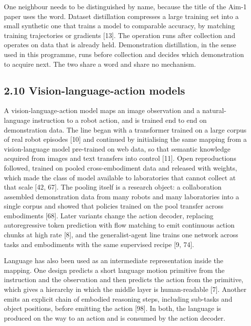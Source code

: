 \documentclass[
  11pt,
]{article}
\begin{document}
One neighbour needs to be distinguished by name, because the title of
the Aim-1 paper uses the word. Dataset distillation compresses a large
training set into a small synthetic one that trains a model to
comparable accuracy, by matching training trajectories or gradients
{[}13{]}. The operation runs after collection and operates on data that
is already held. Demonstration distillation, in the sense used in this
programme, runs before collection and decides which demonstration to
acquire next. The two share a word and share no mechanism.

\hypertarget{vision-language-action-models}{%
\subsection{2.10 Vision-language-action
models}\label{vision-language-action-models}}

A vision-language-action model maps an image observation and a
natural-language instruction to a robot action, and is trained end to
end on demonstration data. The line began with a transformer trained on
a large corpus of real robot episodes {[}10{]} and continued by
initialising the same mapping from a vision-language model pre-trained
on web data, so that semantic knowledge acquired from images and text
transfers into control {[}11{]}. Open reproductions followed, trained on
pooled cross-embodiment data and released with weights, which made the
class of model available to laboratories that cannot collect at that
scale {[}42, 67{]}. The pooling itself is a research object: a
collaboration assembled demonstration data from many robots and many
laboratories into a single corpus and showed that policies trained on
the pool transfer across embodiments {[}68{]}. Later variants change the
action decoder, replacing autoregressive token prediction with flow
matching to emit continuous action chunks at high rate {[}8{]}, and the
generalist-agent line trains one network across tasks and embodiments
with the same supervised recipe {[}9, 74{]}.

Language has also been used as an intermediate representation inside the
mapping. One design predicts a short language motion primitive from the
instruction and the observation and then predicts the action from the
primitive, which gives a hierarchy in which the middle layer is
human-readable {[}7{]}. Another emits an explicit chain of embodied
reasoning steps, including sub-tasks and object positions, before
emitting the action {[}98{]}. In both, the language is produced on the
way to an action and is consumed by the action decoder.
\end{document}
